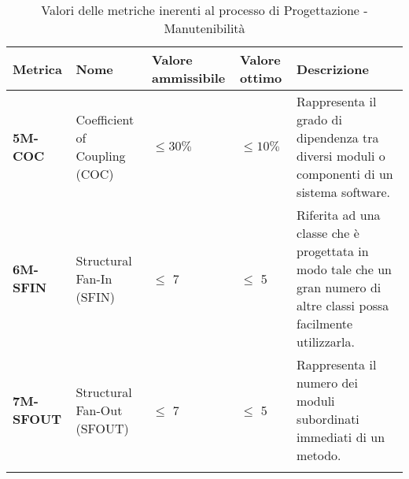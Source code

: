 \begin{longtable}{|>{\raggedright\arraybackslash}m{}|>{\raggedright\arraybackslash}m{}|>{\raggedright\arraybackslash}m{}|>{\raggedright\arraybackslash}m{}|>{\raggedright\arraybackslash}m{}|}
	\hline
	\textbf{Metrica}  & \textbf{Nome}                 & \textbf{Valore ammissibile} & \textbf{Valore ottimo} & \textbf{Descrizione}                                                                                                  \\
	\hline
	\endfirsthead
	\hline
	\textbf{5M-COC}   & Coefficient of Coupling (COC) & $\leq 30\% $                & $\leq 10\% $           & Rappresenta il grado di dipendenza tra diversi moduli o componenti di un sistema software.                            \\
	\hline
	\textbf{6M-SFIN}  & Structural Fan-In (SFIN)      & $\leq$ 7                    & $\le$ 5                & Riferita ad una classe che è progettata in modo tale che un gran numero di altre classi possa facilmente utilizzarla. \\
	\hline
	\textbf{7M-SFOUT} & Structural Fan-Out (SFOUT)    & $\leq$ 7                    & $\le$ 5                & Rappresenta il numero dei moduli subordinati immediati di un metodo.                                                  \\
	\hline
	\caption{Valori delle metriche inerenti al processo di Progettazione - Manutenibilità}
	\label{table:3}
\end{longtable}

